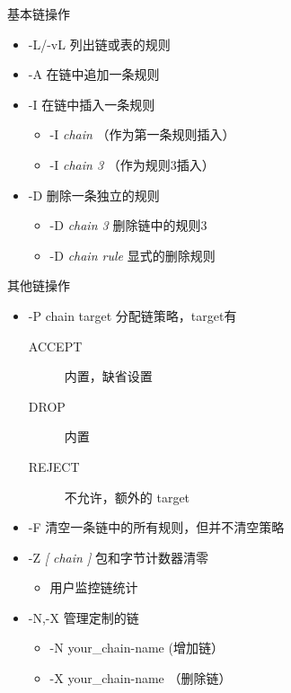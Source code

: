  \begin{frame}{基本链操作}


\begin{itemize}
\item -L/-vL 列出链或表的规则
\item -A 在链中追加一条规则
\item -I 在链中插入一条规则

\begin{itemize}
\item -I \emph{chain} （作为第一条规则插入）
\item -I \emph{chain 3} （作为规则3插入）
\end{itemize}
\item -D 删除一条独立的规则

\begin{itemize}
\item -D \emph{chain 3} 删除链中的规则3
\item -D \emph{chain rule} 显式的删除规则
\end{itemize}
\end{itemize}

\end{frame} 
 \begin{frame}{其他链操作}
\begin{itemize}
\item -P chain target 分配链策略，target有

\begin{description}
\item [{ACCEPT}] 内置，缺省设置
\item [{DROP}] 内置
\item [{REJECT}] 不允许，额外的 target
\end{description}
\item -F 清空一条链中的所有规则，但并不清空策略
\item -Z \emph{{[} chain {]} }包和字节计数器清零

\begin{itemize}
\item 用户监控链统计
\end{itemize}
\item -N,-X 管理定制的链

\begin{itemize}
\item -N your\_chain-name (增加链）
\item -X your\_chain-name （删除链）
\end{itemize}
\end{itemize}

\end{frame} 
